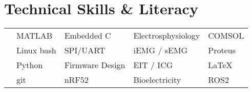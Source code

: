 \section{Technical Skills \& Literacy}
%
%
\begin{tabularx}{1.0\textwidth} { 
   X L R R}
$\> \> \>$    MATLAB	            & Embedded C\     & Electrosphysiology    & COMSOL		\\
$\> \> \>$	  Linux bash	      & SPI/UART        & iEMG / sEMG           & Proteus	      \\
$\> \> \>$	  Python 			& Firmware Design & EIT / ICG             & \LaTeX         	\\
$\> \> \>$    git 			& nRF52           & Bioelectricity        & ROS2            \\
\end{tabularx}